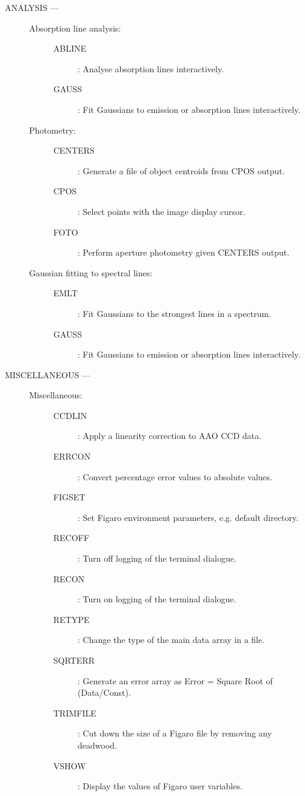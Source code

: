 \begin {description}
\item [ANALYSIS ---]

\begin{description}

\item [Absorption line analysis:]

\begin{description}
\item [ABLINE]: Analyse absorption lines interactively.
\item [GAUSS]: Fit Gaussians to emission or absorption lines interactively.
\end{description}

\item [Photometry:]
\begin{description}
\item [CENTERS]: Generate a file of object centroids from CPOS output.
\item [CPOS]: Select points with the image display cursor.
\item [FOTO]: Perform aperture photometry given CENTERS output.
\end{description}

\item [Gaussian fitting to spectral lines:]
\begin{description}
\item [EMLT]: Fit Gaussians to the strongest lines in a spectrum.
\item [GAUSS]: Fit Gaussians to emission or absorption lines interactively.
\end{description}

\end{description}

\item [MISCELLANEOUS ---]

\begin{description}
\item [Miscellaneous:]
\begin{description}
\item [CCDLIN]: Apply a linearity correction to AAO CCD data.
\item [ERRCON]: Convert percentage error values to absolute values.
\item [FIGSET]: Set Figaro environment parameters, e.g. default directory.
\item [RECOFF]: Turn off logging of the terminal dialogue.
\item [RECON]: Turn on logging of the terminal dialogue.
\item [RETYPE]: Change the type of the main data array in a file.
\item [SQRTERR]: Generate an error array as Error = Square Root of (Data/Const).
\item [TRIMFILE]: Cut down the size of a Figaro file by removing any deadwood.
\item [VSHOW]: Display the values of Figaro user variables.
\end{description}
\end{description}
\end{description}

